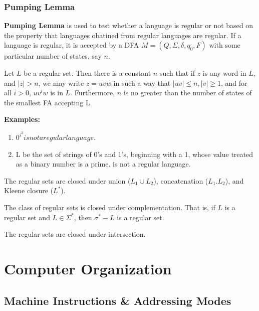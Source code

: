 \documentclass[a4paper,oneside]{book}
\begin{document}
\section{Pumping Lemma}
\textbf{Pumping Lemma} is used to test whether a language is regular or not based on the property that languages obatined from regular languages are regular. If a language is regular,  it is accepted by a DFA $M = (Q, \Sigma, \delta, q_0, F)$ with some particular number of states,  say $n$. 
\begin{lemma}
 Let $L$ be a regular set. Then there is a constant $n$ such that if $z$ is any word in $L$, and $|z| > n$, we may write $z = uvw$ in such a way that $|uv| \le n, |v| \ge 1$, and for all $i > 0$, $uv^iw$ is in $L$. Furthermore, $n$ is no greater than the number of states of the smallest FA accepting L.
\end{lemma}
\textbf{Examples:}
\begin{enumerate}
\item $0^{i^2} is not a regular language$.
\item  L be the set of strings of 0's and 1's, beginning with a 1, whose value treated as a binary number is a prime. is not a regular language.
 \end{enumerate}
\begin{theorem}
The regular sets are closed under union ($L_1 \cup L_2$), concatenation ($L_1 . L_2$), and Kleene closure ($L^*$).
\end{theorem}
\begin{theorem}
The class of regular sets is closed under complementation. That is, if $L$ is a regular set and $L \in \Sigma^*$,  then $\sigma^* - L$ is a regular set.
\end{theorem}
\begin{theorem}
The regular sets are closed under intersection.
\end{theorem}


\part{Computer Organization \cite{patterson2013computer}}
\chapter{Machine Instructions \& Addressing Modes}
\end{document}
